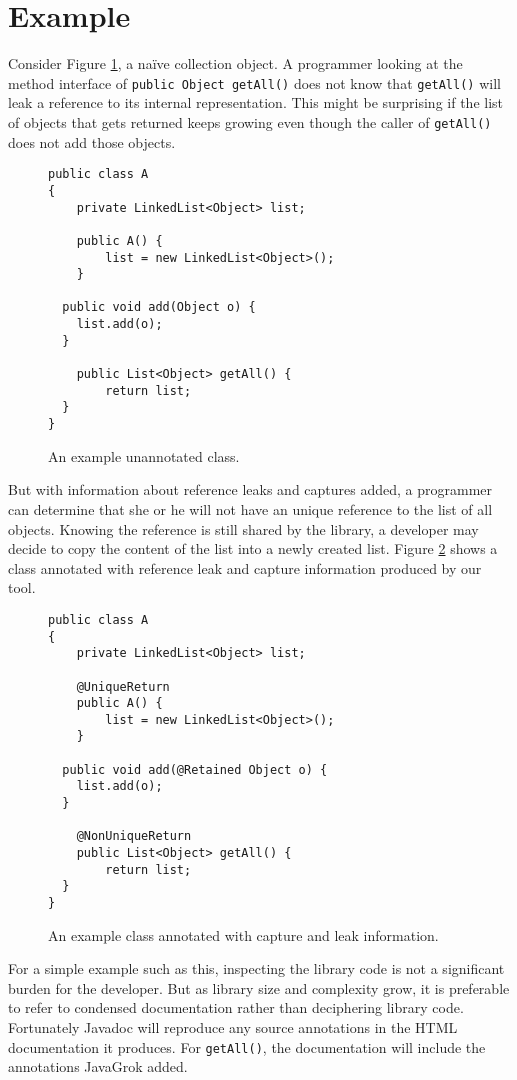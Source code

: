 \section{Example}
\label{sec:Example}

Consider Figure \ref{fig:pre}, a na\"ive collection object.
A programmer looking at the method interface of 
\texttt{public Object getAll()} does not know
that \texttt{getAll()} will leak a reference to its
internal representation. This might be surprising
if the list of objects that gets returned keeps growing
even though the caller of \texttt{getAll()} does not add those objects.

\begin{figure}[h]
\begin{lstlisting}
public class A
{
	private LinkedList<Object> list;
		
	public A() {
		list = new LinkedList<Object>();
	}
		
  public void add(Object o) {
   	list.add(o);
  }
    
	public List<Object> getAll() {
		return list;
  }
}
\end{lstlisting}
\caption{An example unannotated class.}
\label{fig:pre}
\end{figure}

But with information about reference leaks and captures added, a programmer can 
determine that she or he will not have an unique reference
to the list of all objects.  Knowing the reference is still shared by the
library, a developer may decide to copy the content 
of the list into a newly created list.  Figure \ref{fig:postannotation}
shows a class annotated with reference leak and capture information produced by
our tool.

\begin{figure}[h]
\begin{lstlisting}
public class A
{
	private LinkedList<Object> list;
	
	@UniqueReturn
	public A() {
		list = new LinkedList<Object>();
	}
		
  public void add(@Retained Object o) {
   	list.add(o);
  }
  
	@NonUniqueReturn
	public List<Object> getAll() {
		return list;
  }
}
\end{lstlisting}
\caption{An example class annotated with capture and leak information.}
\label{fig:postannotation}
\end{figure}

For a simple example such as this, inspecting the library code is not a
significant burden for the developer.  But as library size and complexity grow,
it is preferable to refer to condensed documentation rather than
deciphering library code.
Fortunately Javadoc will reproduce any source annotations in the HTML
documentation it produces.  For \texttt{getAll()}, the documentation will
include the annotations JavaGrok added.